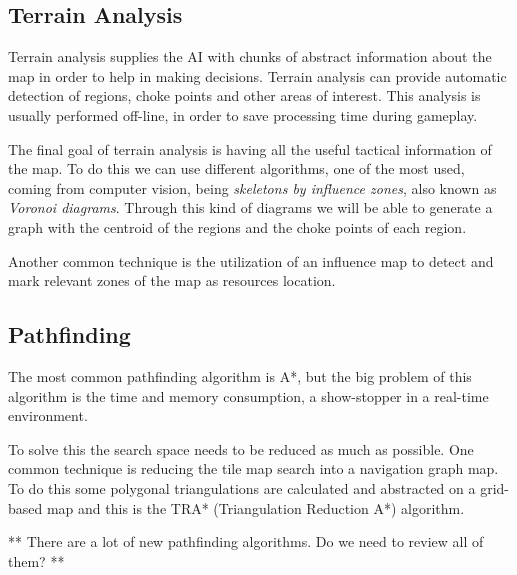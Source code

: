 \documentclass[journal]{IEEEtran}
\begin{document}
\subsection{Terrain Analysis}
{\color{ForestGreen}
Terrain analysis supplies the AI with chunks of abstract information about the map in order to help in making decisions. Terrain analysis can provide automatic detection of regions, choke points and other areas of interest. This analysis is usually performed off-line, in order to save processing time during gameplay.

The final goal of terrain analysis is having all the useful tactical information of the map. To do this we can use different algorithms, one of the most used, coming from computer vision, being \textit{skeletons by influence zones}, also known as \textit{Voronoi diagrams}\cite{Perkins_2010}. Through this kind of diagrams we will be able to generate a graph with the centroid of the regions and the choke points of each region.

Another common technique is the utilization of an influence map to detect and mark relevant zones of the map as resources location.
}

\subsection{Pathfinding}
{\color{ForestGreen}
The most common pathfinding algorithm is A*, but the big problem of this algorithm is the time and  memory consumption, a show-stopper in a real-time environment.

To solve this the search space needs to be reduced as much as possible. One common technique is reducing the tile map search into a navigation graph map. To do this some polygonal triangulations are calculated and abstracted on a grid-based map and this is the TRA* (Triangulation Reduction A*) algorithm\cite{Demyen_2006}. 

** There are a lot of new pathfinding algorithms. Do we need to review all of them? **
}
\end{document}
